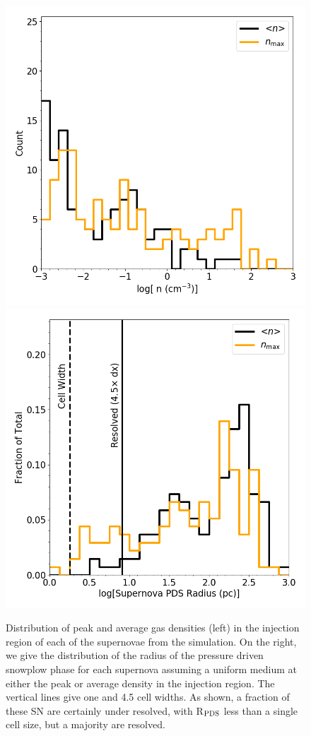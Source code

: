 \documentclass[twocolumn]{aastex61}
\begin{document}
\begin{figure}
\centering
\includegraphics[width=0.4\linewidth]{sn_density_hist}
\includegraphics[width=0.4\linewidth]{sn_radius_hist}
\caption{Distribution of peak and average gas densities (left) in the injection region of each of the supernovae from the simulation. On the right, we give the distribution of the radius of the pressure driven snowplow phase for each supernova assuming a uniform medium at either the peak or average density in the injection region. The vertical lines give one and 4.5 cell widths. As shown, a fraction of these SN are certainly under resolved, with R$_{\rm PDS}$ less than a single cell size, but a majority are resolved.}
\label{fig:supernova histogram}
\end{figure}

%
%
\end{document}
